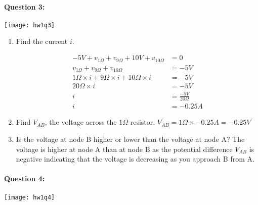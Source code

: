 \documentclass[12pt,letterpaper,titlepage]{article}
\begin{document}
\clearpage

\paragraph{Question 3: }

\begin{center}
\texttt{[image: hw1q3]}
\end{center}

\begin{enumerate}[label=\Alph*.]
\item Find the current $i$.

\begin{align*}
   -5V + v_{1\Omega} + v_{9\Omega} + 10V + v_{10\Omega} 	&= 0
\\ v_{1\Omega} + v_{9\Omega} + v_{10\Omega} 				&= -5V
\\ 1\Omega \times i + 9\Omega \times i + 10\Omega \times i 	&= -5V
\\ 20\Omega \times i 										&= -5V
\\ i 														&= \frac{-5V}{20\Omega}
\\ i 														&= -0.25A
\end{align*}

\item Find $V_{AB}$, the voltage across the $1 \Omega$ resistor. 
$V_{AB} = 1\Omega \times -0.25A = -0.25V$
\item Is the voltage at node B higher or lower than the voltage at node A?
The voltage is higher at node A than at node B as the potential difference $V_{AB}$ is negative indicating that the voltage is decreasing as you approach B from A.
\end{enumerate}



\clearpage

\paragraph{Question 4: }

\begin{center}
\texttt{[image: hw1q4]}
\end{center}
\end{document}
